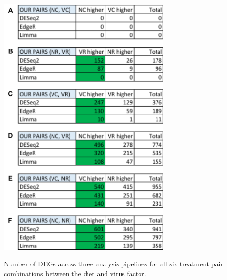 \documentclass[11pt,a4paper,oldfontcommands,openany]{memoir}
\numberwithin{equation}{section} %
\begin{document}
\begin{table}[H]
  \includegraphics[width=0.65\textwidth]{Images/pairDEGs}
  \caption{Number of DEGs across three analysis pipelines for all six treatment pair combinations between the diet and virus factor.}
  \label{tbl:pairDEGs}
\end{table}
\end{document}
